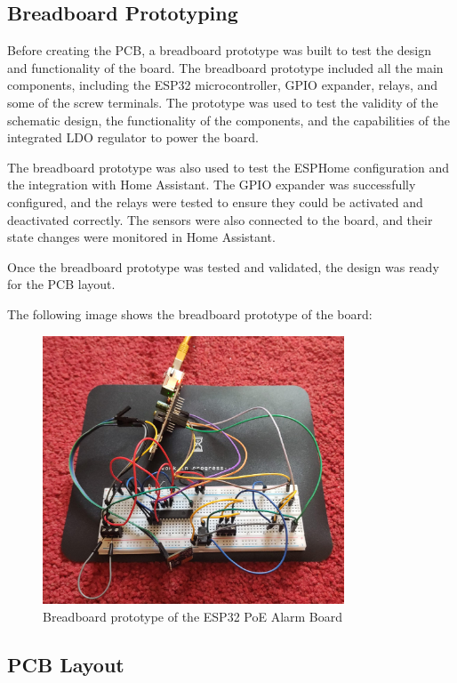 \documentclass[a4paper,12pt]{article}
\begin{document}
\subsection{Breadboard Prototyping}
Before creating the PCB, a breadboard prototype was built to test the design and functionality of the board. The breadboard prototype included all the main components, including the ESP32 microcontroller, GPIO expander, relays, and some of the screw terminals. The prototype was used to test the validity of the schematic design, the functionality of the components, and the capabilities of the integrated LDO regulator to power the board.

The breadboard prototype was also used to test the ESPHome configuration and the integration with Home Assistant. The GPIO expander was successfully configured, and the relays were tested to ensure they could be activated and deactivated correctly. The sensors were also connected to the board, and their state changes were monitored in Home Assistant.

Once the breadboard prototype was tested and validated, the design was ready for the PCB layout.

The following image shows the breadboard prototype of the board:
\begin{figure}[H]
    \centering
    \includegraphics[width=0.8\textwidth]{Media/Breadboard.jpg}
    \caption{Breadboard prototype of the ESP32 PoE Alarm Board}
    \label{fig:breadboard}
\end{figure}

\subsection{PCB Layout}
\end{document}
